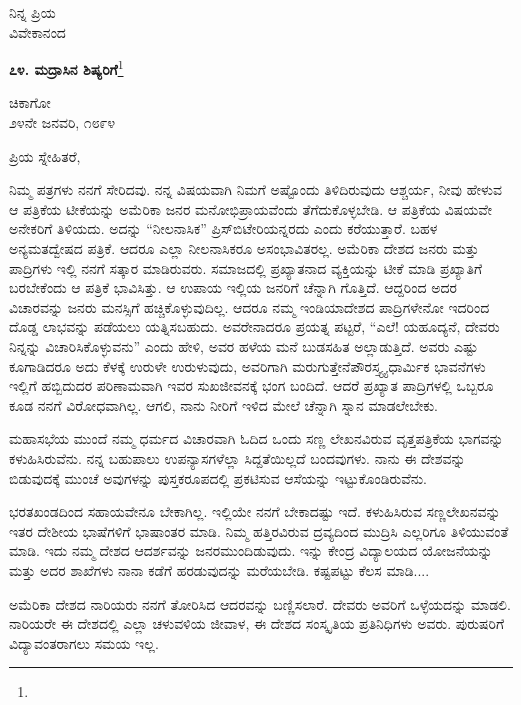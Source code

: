 {\flushright
ನಿನ್ನ ಪ್ರಿಯ\\ವಿವೇಕಾನಂದ\par}

\newpage

\begin{center}
\textbf{೭೪. ಮದ್ರಾಸಿನ ಶಿಷ್ಯರಿಗೆ}\footnote{}
\end{center}

\begin{flushright}
ಚಿಕಾಗೋ\\೨೪ನೇ ಜನವರಿ, ೧೮೯೪
\end{flushright}

\noindent
ಪ್ರಿಯ ಸ್ನೇಹಿತರೆ,

ನಿಮ್ಮ ಪತ್ರಗಳು ನನಗೆ ಸೇರಿದವು. ನನ್ನ ವಿಷಯವಾಗಿ ನಿಮಗೆ ಅಷ್ಟೊಂದು ತಿಳಿದಿರುವುದು ಆಶ್ಚರ್ಯ, ನೀವು ಹೇಳುವ ಆ ಪತ್ರಿಕೆಯ ಟೀಕೆಯನ್ನು ಅಮೆರಿಕಾ ಜನರ ಮನೋಭಿಪ್ರಾಯವೆಂದು ತೆಗೆದುಕೊಳ್ಳಬೇಡಿ. ಆ ಪತ್ರಿಕೆಯ ವಿಷಯವೇ ಅನೇಕರಿಗೆ ತಿಳಿಯದು. ಅದನ್ನು “ನೀಲನಾಸಿಕ” ಪ್ರಿಸ್‌ಬಿಟೇರಿಯನ್ನರದು ಎಂದು ಕರೆಯುತ್ತಾರೆ. ಬಹಳ ಅನ್ಯಮತದ್ವೇಷದ ಪತ್ರಿಕೆ. ಆದರೂ ಎಲ್ಲಾ ನೀಲನಾಸಿಕರೂ ಅಸಂಭಾವಿತರಲ್ಲ. ಅಮೆರಿಕಾ ದೇಶದ ಜನರು ಮತ್ತು ಪಾದ್ರಿಗಳು ಇಲ್ಲಿ ನನಗೆ ಸತ್ಕಾರ ಮಾಡಿರುವರು. ಸಮಾಜದಲ್ಲಿ ಪ್ರಖ್ಯಾತನಾದ ವ್ಯಕ್ತಿಯನ್ನು ಟೀಕೆ ಮಾಡಿ ಪ್ರಖ್ಯಾತಿಗೆ ಬರಬೇಕೆಂದು ಆ ಪತ್ರಿಕೆ ಭಾವಿಸಿತ್ತು. ಆ ಉಪಾಯ ಇಲ್ಲಿಯ ಜನರಿಗೆ ಚೆನ್ನಾಗಿ ಗೊತ್ತಿದೆ. ಆದ್ದರಿಂದ ಅದರ ವಿಚಾರವನ್ನು ಜನರು ಮನಸ್ಸಿಗೆ ಹಚ್ಚಿಕೊಳ್ಳುವುದಿಲ್ಲ. ಆದರೂ ನಮ್ಮ ಇಂಡಿಯಾದೇಶದ ಪಾದ್ರಿಗಳೇನೋ ಇದರಿಂದ ದೊಡ್ಡ ಲಾಭವನ್ನು ಪಡೆಯಲು ಯತ್ನಿಸಬಹುದು. ಅವರೇನಾದರೂ ಪ್ರಯತ್ನ ಪಟ್ಟರೆ, “ಎಲೆ! ಯಹೂದ್ಯನೆ, ದೇವರು ನಿನ್ನನ್ನು ವಿಚಾರಿಸಿಕೊಳ್ಳುವನು” ಎಂದು ಹೇಳಿ, ಅವರ ಹಳೆಯ ಮನೆ ಬುಡಸಹಿತ ಅಲ್ಲಾಡುತ್ತಿದೆ. ಅವರು ಎಷ್ಟು ಕೂಗಾಡಿದರೂ ಅದು ಕೆಳಕ್ಕೆ ಉರುಳೇ ಉರುಳುವುದು, ಅವರಿಗಾಗಿ ಮರುಗುತ್ತೇನೆ\enginline{-}ಪೌರಸ್ತ್ಯ್ಯ ಧಾರ್ಮಿಕ ಭಾವನೆಗಳು ಇಲ್ಲಿಗೆ ಹಬ್ಬಿದುದರ ಪರಿಣಾಮವಾಗಿ ಇವರ ಸುಖಜೀವನಕ್ಕೆ ಭಂಗ ಬಂದಿದೆ. ಆದರೆ ಪ್ರಖ್ಯಾತ ಪಾದ್ರಿಗಳಲ್ಲಿ ಒಬ್ಬರೂ ಕೂಡ ನನಗೆ ವಿರೋಧವಾಗಿಲ್ಲ. ಆಗಲಿ, ನಾನು ನೀರಿಗೆ ಇಳಿದ ಮೇಲೆ ಚೆನ್ನಾಗಿ ಸ್ನಾನ ಮಾಡಲೇಬೇಕು.

ಮಹಾಸಭೆಯ ಮುಂದೆ ನಮ್ಮ ಧರ್ಮದ ವಿಚಾರವಾಗಿ ಓದಿದ ಒಂದು ಸಣ್ಣ ಲೇಖನವಿರುವ ವೃತ್ತಪತ್ರಿಕೆಯ ಭಾಗವನ್ನು ಕಳುಹಿಸಿರುವೆನು. ನನ್ನ ಬಹುಪಾಲು ಉಪನ್ಯಾಸಗಳೆಲ್ಲಾ ಸಿದ್ದತೆಯಿಲ್ಲದೆ ಬಂದವುಗಳು. ನಾನು ಈ ದೇಶವನ್ನು ಬಿಡುವುದಕ್ಕೆ ಮುಂಚೆ ಅವುಗಳನ್ನು ಪುಸ್ತಕರೂಪದಲ್ಲಿ ಪ್ರಕಟಿಸುವ ಆಸೆಯನ್ನು ಇಟ್ಟುಕೊಂಡಿರುವೆನು.

ಭರತಖಂಡದಿಂದ ಸಹಾಯವೇನೂ ಬೇಕಾಗಿಲ್ಲ. ಇಲ್ಲಿಯೇ ನನಗೆ ಬೇಕಾದಷ್ಟು ಇದೆ. ಕಳುಹಿಸಿರುವ ಸಣ್ಣಲೇಖನವನ್ನು ಇತರ ದೇಶೀಯ ಭಾಷೆಗಳಿಗೆ ಭಾಷಾಂತರ ಮಾಡಿ. ನಿಮ್ಮ ಹತ್ತಿರವಿರುವ ದ್ರವ್ಯದಿಂದ ಮುದ್ರಿಸಿ ಎಲ್ಲರಿಗೂ ತಿಳಿಯುವಂತೆ ಮಾಡಿ. ಇದು ನಮ್ಮ ದೇಶದ ಆದರ್ಶವನ್ನು ಜನರಮುಂದಿಡುವುದು. ಇನ್ನು ಕೇಂದ್ರ ವಿದ್ಯಾಲಯದ ಯೋಜನೆಯನ್ನು ಮತ್ತು ಅದರ ಶಾಖೆಗಳು ನಾನಾ ಕಡೆಗೆ ಹರಡುವುದನ್ನು ಮರೆಯಬೇಡಿ. ಕಷ್ಟಪಟ್ಟು ಕೆಲಸ ಮಾಡಿ....

ಅಮೆರಿಕಾ ದೇಶದ ನಾರಿಯರು ನನಗೆ ತೋರಿಸಿದ ಆದರವನ್ನು ಬಣ್ಣಿಸಲಾರೆ. ದೇವರು ಅವರಿಗೆ ಒಳ್ಳೆಯದನ್ನು ಮಾಡಲಿ. ನಾರಿಯರೇ ಈ ದೇಶದಲ್ಲಿ ಎಲ್ಲಾ ಚಳುವಳಿಯ ಜೀವಾಳ, ಈ ದೇಶದ ಸಂಸ್ಕೃತಿಯ ಪ್ರತಿನಿಧಿಗಳು ಅವರು. ಪುರುಷರಿಗೆ ವಿದ್ಯಾವಂತರಾಗಲು ಸಮಯ ಇಲ್ಲ.

